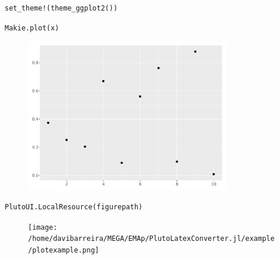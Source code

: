 \begin{lstlisting}[language=JuliaLocal, style=julia]
set_theme!(theme_ggplot2())
\end{lstlisting}

\begin{lstlisting}[language=JuliaLocal, style=julia]
Makie.plot(x)
\end{lstlisting}

\begin{figure}[H]
	\centering
	\includegraphics[width=0.8\textwidth]{./figures/examplepluto_figure2.pdf}
	\label{fig:examplepluto_figure2.pdf}

\end{figure}

\begin{lstlisting}[language=JuliaLocal, style=julia]
PlutoUI.LocalResource(figurepath)
\end{lstlisting}

\begin{figure}[H]
	\centering
	\texttt{[image: /home/davibarreira/MEGA/EMAp/PlutoLatexConverter.jl/example/plotexample.png]}
	\label{fig:/home/davibarreira/MEGA/EMAp/PlutoLatexConverter.jl/example/plotexample.png}

\end{figure}
